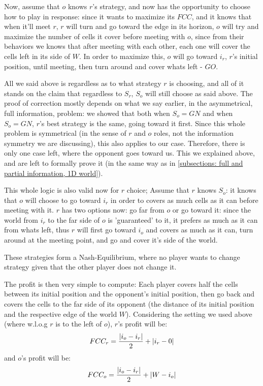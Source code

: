 \documentclass[a4paper,10pt]{article}
\newcommand\rob{\ensuremath{r}\xspace}
\newcommand\opp{\ensuremath{o}\xspace}
\newcommand{\w}{\ensuremath{W}\xspace}
\newcommand{\fcc}{\ensuremath{FCC}\xspace}
\newcommand{\gn}{\ensuremath{GN}\xspace}
\newcommand{\go}{\ensuremath{GO}\xspace}
\DeclarePairedDelimiter\abs{\lvert}{\rvert}%
\begin{document}
Now, assume that \opp knows \rob's strategy, and now has the opportunity to choose how to play in response: since it wants to maximize its \fcc, and it knows that when it'll meet \rob, \rob will turn and go toward the edge in its horizon, \opp will try and maximize the number of cells it cover before meeting with \opp, since from their behaviors we knows that after meeting with each other, each one will cover the cells left in its side of \w. In order to maximize this, \opp will go toward $i_{\rob}$, \rob's initial position, until meeting, then turn around and cover whats left - \go.

All we said above is regardless as to what strategy \rob is choosing, and all of it stands on the claim that regardless to $S_{\rob}$, $S_{\opp}$ will still choose as said above. The proof of correction mostly depends on what we say earlier, in the asymmetrical, full information, problem: we showed that both when $S_{\opp}=\gn$ and when $S_{\opp}=\gn$, \rob's best strategy is the same, going toward it first. Since this whole problem is symmetrical (in the sense of \rob and \opp roles, not the information symmetry we are discussing), this also applies to our case.
Therefore, there is only one case left, where the opponent goes toward us. This we explained above, and are left to formally prove it (in the same way as in \ref{subsections: full and partial information, 1D world}).


This whole logic is also valid now for \rob choice; Assume that \rob knows $S_{\opp}$: it knows that \opp will choose to  go toward $i_{\rob}$ in order to covers as much cells as it can before meeting with it. \rob has two options now: go far from \opp or go toward it: since the world from $i_{\rob}$ to the far side of \opp is 'guaranteed' to it, it prefers as much as it can from whats left, thus \rob will first go toward $i_{\opp}$ and covers as much as it can, turn around at the meeting point, and go and cover it's side of the world.

These strategies form a Nash-Equilibrium, where no player wants to change strategy given that the other player does not change it.

The profit is then very simple to compute:
Each player covers half the cells between its initial position and the opponent's initial position, then go back and covers the cells to the far side of its opponent (the distance of its initial position and the respective edge of the world \w).
Considering the setting we used above (where w.l.o.g \rob is to the  left of \opp), \rob's profit will be:\[\fcc_r=\frac{\abs*{i_{\opp} - i_{\rob}}}{2}+\abs*{i_{\rob}-0}\] and \opp's profit will be: \[\fcc_{\opp}=\frac{\abs*{i_{\opp} - i_{\rob}}}{2}+\abs*{\w - i_{\opp}}\]
\end{document}
